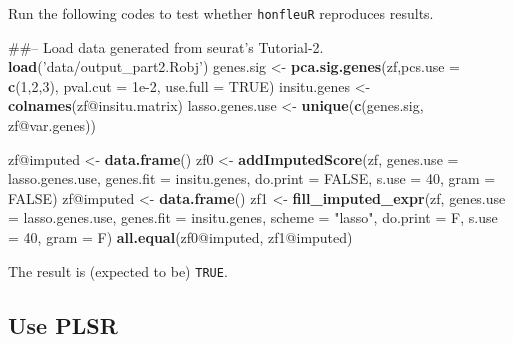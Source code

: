 \documentclass[]{article}
\newenvironment{Shaded}{\begin{snugshade}}{\end{snugshade}}
\newcommand{\KeywordTok}[1]{\textcolor[rgb]{0.13,0.29,0.53}{\textbf{{#1}}}}
\newcommand{\DataTypeTok}[1]{\textcolor[rgb]{0.13,0.29,0.53}{{#1}}}
\newcommand{\DecValTok}[1]{\textcolor[rgb]{0.00,0.00,0.81}{{#1}}}
\newcommand{\FloatTok}[1]{\textcolor[rgb]{0.00,0.00,0.81}{{#1}}}
\newcommand{\StringTok}[1]{\textcolor[rgb]{0.31,0.60,0.02}{{#1}}}
\newcommand{\OtherTok}[1]{\textcolor[rgb]{0.56,0.35,0.01}{{#1}}}
\newcommand{\NormalTok}[1]{{#1}}
\begin{document}
Run the following codes to test whether \texttt{honfleuR} reproduces
results.

\begin{Shaded}
\begin{Highlighting}[]
\NormalTok{##-- Load data generated from seurat's Tutorial-2.}
\KeywordTok{load}\NormalTok{(}\StringTok{'data/output_part2.Robj'}\NormalTok{)}
\NormalTok{genes.sig <-}\StringTok{ }\KeywordTok{pca.sig.genes}\NormalTok{(zf,}\DataTypeTok{pcs.use =} \KeywordTok{c}\NormalTok{(}\DecValTok{1}\NormalTok{,}\DecValTok{2}\NormalTok{,}\DecValTok{3}\NormalTok{), }\DataTypeTok{pval.cut =} \FloatTok{1e-2}\NormalTok{, }\DataTypeTok{use.full =} \OtherTok{TRUE}\NormalTok{)}
\NormalTok{insitu.genes <-}\StringTok{ }\KeywordTok{colnames}\NormalTok{(zf@insitu.matrix)}
\NormalTok{lasso.genes.use <-}\StringTok{ }\KeywordTok{unique}\NormalTok{(}\KeywordTok{c}\NormalTok{(genes.sig, zf@var.genes))}
\end{Highlighting}
\end{Shaded}

\begin{Shaded}
\begin{Highlighting}[]
\NormalTok{zf@imputed <-}\StringTok{ }\KeywordTok{data.frame}\NormalTok{()}
\NormalTok{zf0 <-}\StringTok{ }\KeywordTok{addImputedScore}\NormalTok{(zf, }\DataTypeTok{genes.use =} \NormalTok{lasso.genes.use, }\DataTypeTok{genes.fit =} \NormalTok{insitu.genes, }
                       \DataTypeTok{do.print =} \OtherTok{FALSE}\NormalTok{, }\DataTypeTok{s.use =} \DecValTok{40}\NormalTok{, }\DataTypeTok{gram =} \OtherTok{FALSE}\NormalTok{)}
\NormalTok{zf@imputed <-}\StringTok{ }\KeywordTok{data.frame}\NormalTok{()}
\NormalTok{zf1 <-}\StringTok{ }\KeywordTok{fill_imputed_expr}\NormalTok{(zf, }\DataTypeTok{genes.use =} \NormalTok{lasso.genes.use, }\DataTypeTok{genes.fit =} \NormalTok{insitu.genes, }
                         \DataTypeTok{scheme =} \StringTok{"lasso"}\NormalTok{,}
                         \DataTypeTok{do.print =} \NormalTok{F, }\DataTypeTok{s.use =} \DecValTok{40}\NormalTok{, }\DataTypeTok{gram =} \NormalTok{F)}
\KeywordTok{all.equal}\NormalTok{(zf0@imputed, zf1@imputed)}
\end{Highlighting}
\end{Shaded}

The result is (expected to be) \texttt{TRUE}.

\subsection{Use PLSR}\label{use-plsr}
\end{document}
